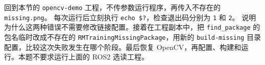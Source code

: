 \begin{exercise}\label{ex:v1-build-exit-code}
回到本节的 \texttt{opencv-demo} 工程，不传参数运行程序，再传入不存在的 \texttt{missing.png}。
每次运行后立刻执行 \texttt{echo \$?}，检查退出码分别为 \texttt{1} 和 \texttt{2}。
说明为什么这两种错误不需要修改链接配置。接着在工程副本中，把 \texttt{find\_package} 的包名临时改成不存在的 \texttt{RMTrainingMissingPackage}，用新的 \texttt{build-missing} 目录配置，比较这次失败发生在哪个阶段。最后恢复 OpenCV，再配置、构建和运行。本题不要求运行上面的 ROS2 选读工程。
\end{exercise}
